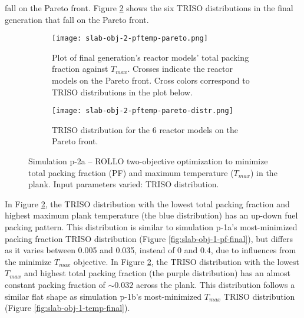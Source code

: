 fall on the Pareto front.
Figure \ref{fig:slab-obj-2-pftemp-pareto-distr} shows the six TRISO distributions in 
the final generation that fall on the Pareto front. 
\begin{figure}[htbp]
    \centering
    \begin{subfigure}{\textwidth}
        \texttt{[image: slab-obj-2-pftemp-pareto.png]}
        \caption{Plot of final generation's reactor models' total packing fraction against 
        $T_{max}$. Crosses indicate the reactor models on the Pareto front. Cross colors correspond  
        to TRISO distributions in the plot below.}
        \label{fig:slab-obj-2-pftemp-pareto} 
    \end{subfigure}
    \begin{subfigure}{\textwidth}
        \texttt{[image: slab-obj-2-pftemp-pareto-distr.png]}
        \caption{TRISO distribution for the 6 reactor models on the Pareto front.}
        \label{fig:slab-obj-2-pftemp-pareto-distr} 
    \end{subfigure}
    \caption{Simulation p-2a -- ROLLO two-objective optimization to minimize total packing fraction (PF) and  
    maximum temperature ($T_{max}$) in the plank. Input parameters varied: 
    TRISO distribution.}
    \label{fig:slab-obj-2-pftemp}
\end{figure}
In Figure \ref{fig:slab-obj-2-pftemp-pareto-distr}, the TRISO distribution with the lowest 
total packing fraction and highest maximum plank temperature (the blue distribution) has 
an up-down fuel packing pattern. 
This distribution is similar to simulation p-1a's most-minimized packing fraction TRISO 
distribution (Figure \ref{fig:slab-obj-1-pf-final}), but differs as it varies between 
0.005 and 0.035, instead of 0 and 0.4, due to influences from the minimize $T_{max}$ 
objective. 
In Figure \ref{fig:slab-obj-2-pftemp-pareto-distr}, the TRISO distribution with the 
lowest $T_{max}$ and highest total packing fraction (the purple distribution)
has an almost constant packing fraction of $\sim0.032$ across the plank. 
This distribution follows a similar flat shape as simulation p-1b's most-minimized 
$T_{max}$ TRISO distribution (Figure \ref{fig:slab-obj-1-temp-final}).

